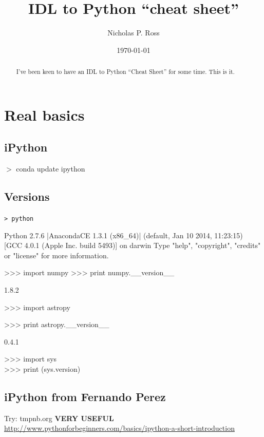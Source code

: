 \documentclass[11pt,a4paper]{article}
\begin{document}
\title{IDL to Python ``cheat sheet''}
\author{Nicholas P. Ross}
\date{\today}
\maketitle



\begin{abstract}
I've been keen to have an IDL to Python ``Cheat Sheet'' for some time. 
This is it. 
\end{abstract}

\section{Real basics}
    \subsection{iPython}
     $>$ conda update ipython

    \subsection{Versions}
    {\tt > python
      
      Python 2.7.6 |AnacondaCE 1.3.1 (x86\_64)| (default, Jan 10 2014, 11:23:15) 
      [GCC 4.0.1 (Apple Inc. build 5493)] on darwin 
      Type "help", "copyright", "credits" or "license" for more information. 

      >>> import numpy 
      >>> print numpy.\_\_version\_\_ 

      1.8.2 

      >>> import astropy 

      >>> print astropy.\_\_version\_\_ 

      0.4.1 

     >>> import sys\\ 
     >>> print (sys.version) \\
     }

    \subsection{iPython from Fernando Perez}
    Try: tmpnb.org  {\bf VERY USEFUL}\\
    \href{http://www.pythonforbeginners.com/basics/ipython-a-short-introduction}{http://www.pythonforbeginners.com/basics/ipython-a-short-introduction}
\end{document}
